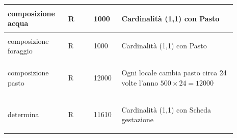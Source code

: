 \documentclass[12pt,a4paper]{article}
\begin{document}
\begin{center}
\begin{longtable}{|p{0.23\linewidth}|p{0.1\linewidth}|p{0.11\linewidth}|p{0.45\linewidth}|}
\hline
composizione acqua 				& \begin{center}
\vspace{-25pt}R
\end{center}
					& \begin{center}
					\vspace{-25pt}1000\end{center}
					& \begin{flushleft}\vspace{-25pt} Cardinalità (1,1) con Pasto \end{flushleft}\\ 

\hline
composizione foraggio 				& \begin{center}
\vspace{-25pt}R
\end{center}
					& \begin{center}
					\vspace{-25pt}1000\end{center}
					& \begin{flushleft}\vspace{-25pt} Cardinalità (1,1) con Pasto \end{flushleft}\\ 

\hline
composizione pasto 				& \begin{center}
\vspace{-25pt}R
\end{center}
					& \begin{center}
					\vspace{-25pt}12000\end{center}
					& \begin{flushleft}\vspace{-25pt} Ogni locale cambia pasto circa 24 volte l'anno $500\times 24= 12000$ \end{flushleft}\\ 

\hline
determina 				& \begin{center}
\vspace{-25pt}R
\end{center}
					& \begin{center}
					\vspace{-25pt}11610\end{center}
					& \begin{flushleft}\vspace{-25pt} Cardinalità (1,1) con Scheda gestazione \end{flushleft}\\ 


\end{longtable}
\end{center}
\end{document}
